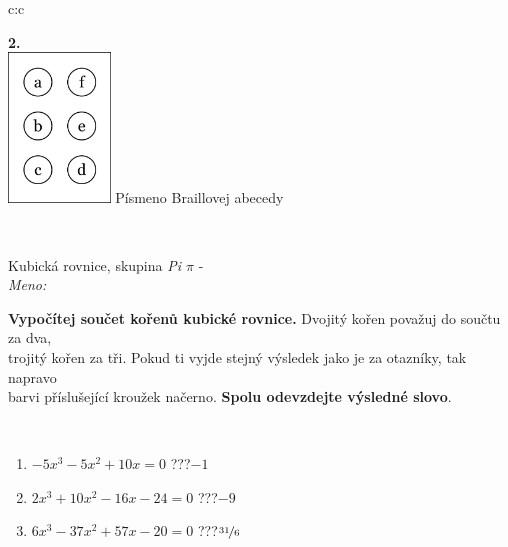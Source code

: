 \documentclass[10pt]{report}
\begin{document}
\begin{tabular}{c:c}
\begin{minipage}[c][104.5mm][t]{0.5\linewidth}
\begin{center}
\begin{minipage}{0.79\linewidth}
\begin{center}
\begin{varwidth}{\linewidth}
\end{varwidth}
\end{center}
\end{minipage}
\begin{minipage}{0.20\linewidth}
\begin{center}
{\Huge\bfseries 2.} \\[2mm]
\includegraphics[height=40mm]{../images/braille.png}
{\small Písmeno Braillovej abecedy}
\end{center}
\end{minipage}
\end{center}
\end{minipage}
\\ \hdashline
\begin{minipage}[c][104.5mm][t]{0.5\linewidth}
\begin{center}
\vspace{7mm}
{\huge Kubická rovnice, skupina \textit{Pi $\pi$} -}\\[5mm]
\textit{Meno:}\phantom{xxxxxxxxxxxxxxxxxxxxxxxxxxxxxxxxxxxxxxxxxxxxxxxxxxxxxxxxxxxxxxxxx}\\[5mm]
\begin{minipage}{0.95\linewidth}
\textbf{Vypočítej součet kořenů kubické rovnice.} Dvojitý kořen považuj do součtu za dva,\\trojitý kořen za tři. Pokud ti vyjde stejný výsledek jako je za otazníky, tak napravo\\barvi příslušející kroužek načerno. \textbf{Spolu odevzdejte výsledné slovo}.
\end{minipage}
\\[1mm]
\begin{minipage}{0.79\linewidth}
\begin{center}
\begin{varwidth}{\linewidth}
\begin{enumerate}
\Large
\item $-5x^3-5x^2+10x=0$\quad \dotfill\; ???\;\dotfill \quad $-1$
\item $2x^3+10x^2-16x-24=0$\quad \dotfill\; ???\;\dotfill \quad $-9$
\item $6x^3-37x^2+57x-20=0$\quad \dotfill\; ???\;\dotfill \quad $\nicefrac{31}{6}$

\end{enumerate}
\end{varwidth}
\end{center}
\end{minipage}
\end{center}
\end{minipage}
\end{tabular}
\end{document}
